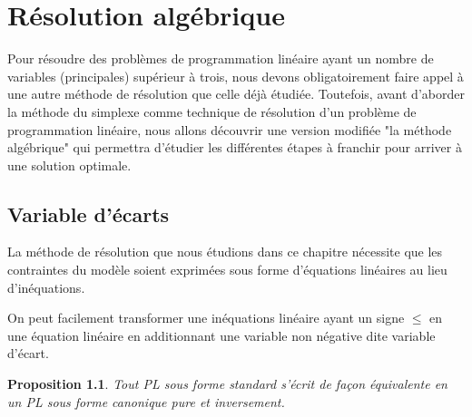 \documentclass[a4paper,12pt,openany]{book}
\theoremstyle{plain}
\newtheorem{proposition}[theorem]{Proposition}
\theoremstyle{definition}
\theoremstyle{remark}
\theoremstyle{nbstyle}
\begin{document}
	\chapter{Résolution algébrique}
	
	Pour résoudre des problèmes de programmation linéaire ayant un nombre de variables (principales) supérieur à trois, nous devons obligatoirement faire appel à une autre méthode de résolution que celle déjà étudiée. Toutefois, avant d'aborder la méthode du simplexe comme technique de résolution d'un problème de programmation linéaire, nous allons découvrir une version modifiée "la méthode algébrique" qui permettra d'étudier les différentes étapes à franchir pour arriver à une solution optimale.
	
	\section{Variable d'écarts}
	
	La méthode de résolution que nous étudions dans ce chapitre nécessite que les contraintes du modèle soient exprimées sous forme d'équations linéaires au lieu d'inéquations.
	
	On peut facilement transformer une inéquations linéaire ayant un signe $\leq$ en une équation linéaire en additionnant une variable non négative dite variable d'écart.
	
	\begin{proposition}
		Tout PL sous forme standard s'écrit de façon équivalente en un PL sous forme canonique pure et inversement.
	\end{proposition}
	\label{prop:2.1}
	
\end{document}
